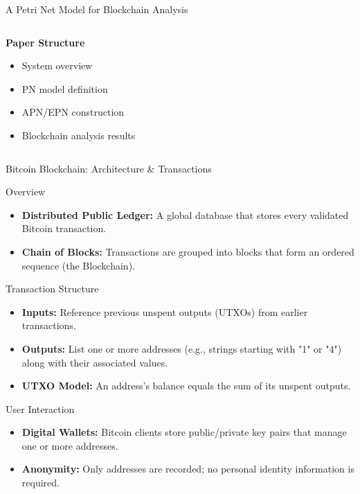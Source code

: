 \documentclass{beamer}
\begin{document}
\begin{frame}{A Petri Net Model for Blockchain Analysis}
\begin{columns}[T]
        \begin{column}{0.5\textwidth}
            \textbf{Paper Structure}
            \begin{itemize}
                \item System overview
                \item PN model definition
                \item APN/EPN construction
                \item Blockchain analysis results
            \end{itemize}
        \end{column}
    \end{columns}
\end{frame}

\begin{frame}{Bitcoin Blockchain: Architecture \& Transactions}
    \footnotesize
    \vspace{-0.2cm}
    \begin{block}{Overview}
        \begin{itemize}
            \item \textbf{Distributed Public Ledger:} A global database that stores every validated Bitcoin transaction.
            \item \textbf{Chain of Blocks:} Transactions are grouped into blocks that form an ordered sequence (the Blockchain).
        \end{itemize}
    \end{block}

    \vspace{-0.2cm}
    \begin{block}{Transaction Structure}
        \begin{itemize}
            \item \textbf{Inputs:} Reference previous unspent outputs (UTXOs) from earlier transactions.
            \item \textbf{Outputs:} List one or more addresses (e.g., strings starting with "1" or "4") along with their associated values.
            \item \textbf{UTXO Model:} An address's balance equals the sum of its unspent outputs.
        \end{itemize}
    \end{block}

    \vspace{-0.2cm}
    \begin{block}{User Interaction}
        \begin{itemize}
            \item \textbf{Digital Wallets:} Bitcoin clients store public/private key pairs that manage one or more addresses.
            \item \textbf{Anonymity:} Only addresses are recorded; no personal identity information is required.
        \end{itemize}
    \end{block}
\end{frame}
\end{document}
